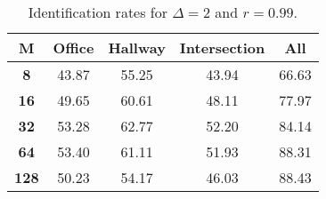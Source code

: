 \begin{table}[h]
    \footnotesize
    \centering
    \begin{tabular}{|c|c|c|c|l|}    
    \hline
    {\bf M} & {\bf Office} & {\bf Hallway} & {\bf Intersection} &     \multicolumn{1}{c|}{{\bf All}} \\ \hline
    {\bf 8} & 43.87 & 55.25 & 43.94 & 66.63 \\ \hline
    {\bf 16} & 49.65 & 60.61 & 48.11 & 77.97 \\ \hline
    {\bf 32} & 53.28 & 62.77 & 52.20 & 84.14 \\ \hline
    {\bf 64} & 53.40 & 61.11 & 51.93 & 88.31 \\ \hline
    {\bf 128} & 50.23 & 54.17 & 46.03 & 88.43 \\ \hline
    \end{tabular}
    \caption{Identification rates for $\Delta = 2$ and $r = 0.99$.}    
    \label{tab:identify_speakers_0.99_mit_19_2}
\end{table}
